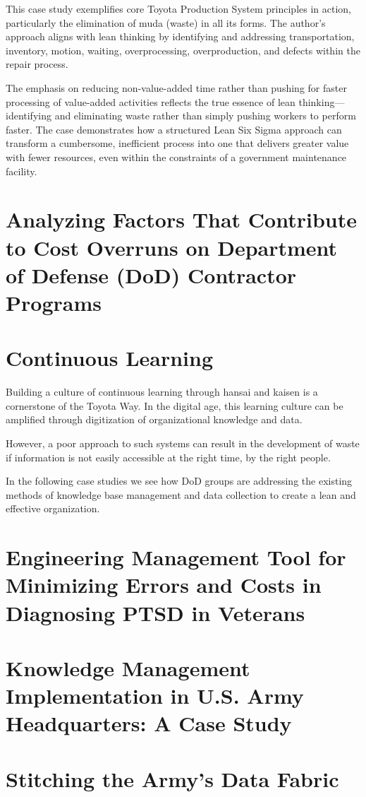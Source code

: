 \documentclass{article}
\begin{document}
			This case study exemplifies core Toyota Production System principles in action, particularly the elimination of muda (waste) in all its forms. The author's approach aligns with lean thinking by identifying and addressing transportation, inventory, motion, waiting, overprocessing, overproduction, and defects within the repair process. 

			The emphasis on reducing non-value-added time rather than pushing for faster processing of value-added activities reflects the true essence of lean thinking—identifying and eliminating waste rather than simply pushing workers to perform faster. The case demonstrates how a structured Lean Six Sigma approach can transform a cumbersome, inefficient process into one that delivers greater value with fewer resources, even within the constraints of a government maintenance facility.




		\section{Analyzing Factors That Contribute to Cost Overruns on Department of Defense (DoD) Contractor Programs \cite{FunchesAllen2025}}






	\section{Continuous Learning}

		Building a culture of continuous learning through hansai and kaisen is a cornerstone of the Toyota Way.
		In the digital age, this learning culture can be amplified through digitization of organizational knowledge and data.

		However, a poor approach to such systems can result in the development of waste if information is not easily accessible at the right time, by the right people.

		In the following case studies we see how DoD groups are addressing the existing methods of knowledge base management and data collection to create a lean and effective organization.

		\section{Engineering Management Tool for Minimizing Errors and Costs in Diagnosing PTSD in Veterans \cite{Le2023}}


		\section{Knowledge Management Implementation in U.S. Army Headquarters: A Case Study \cite{VanLaar2023}}


		\section{Stitching the Army's Data Fabric \cite{Patel2021}}






\newpage


\nocite{*}

\end{document}
